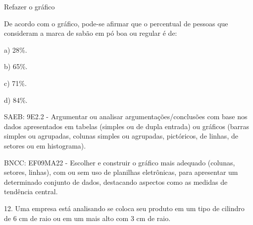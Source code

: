 \begin{escolha}
\begin{boxmedio}
\begin{boxmedio}
{\begin{boxpeq}
\begin{boxpeq}
{\begin{boxpeq}
\begin{boxmedio}
\begin{boxmedio}
\begin{boxpeq}
\begin{boxmedio}
\begin{boxpeq}
\begin{boxpeq}
\begin{boxpeq}
\begin{boxpeq}
\begin{boxmedio}
{\begin{boxmedio}
\begin{boxmedio}
\begin{boxpeq}
\begin{boxmedio}
\begin{boxpeq}
\begin{boxpeq}
\begin{boxpeq}
\begin{escolha}
{\begin{boxmedio}
\begin{boxpeq}
\begin{boxpeq}
\begin{boxpeq}
\begin{boxpeq}
\begin{boxpeq}
\begin{boxmedio}
\begin{boxpeq}
\begin{boxpeq}
\begin{boxpeq}
{\begin{boxpeq}
\begin{boxmedio}
\begin{boxpeq}
\begin{boxpeq}
\begin{boxpeq}
{\begin{boxpeq}
\begin{boxmedio}
{\begin{boxpeq}
\begin{boxpeq}
\begin{boxmedio}
\begin{boxmedio}
\begin{boxpeq}
\begin{boxpeq}
{\begin{boxpeq}
\begin{boxpeq}
\begin{boxpeq}
\begin{boxpeq}
\begin{boxpeq}
\begin{escolha}
\begin{escolha}
{\begin{boxmedio}
\begin{boxpeq}
\begin{q°}
\begin{boxmedio}
\begin{boxpeq}
\begin{boxpeq}
\begin{boxmedio}
\begin{boxmedio}
\begin{boxmedio}
\begin{boxmedio}
{\begin{escolha}
\begin{escolha}
\begin{escolha}
\begin{escolha}
\begin{escolha}
\begin{escolha}
{\begin{figure}
\end{figure}

Refazer o gráfico

De acordo com o gráfico, pode-se afirmar que o percentual de pessoas que
consideram a marca de sabão em pó boa ou regular é de:

a) 28\%.

b) 65\%.

c) 71\%.

d) 84\%.

SAEB: 9E2.2 - Argumentar ou analisar argumentações/conclusões com base
nos dados apresentados em tabelas (simples ou de dupla entrada) ou
gráficos (barras simples ou agrupadas, colunas simples ou agrupadas,
pictóricos, de linhas, de setores ou em histograma).

BNCC: EF09MA22 - Escolher e construir o gráfico mais adequado (colunas,
setores, linhas), com ou sem uso de planilhas eletrônicas, para
apresentar um determinado conjunto de dados, destacando aspectos como as
medidas de tendência central.

12. Uma empresa está analisando se coloca seu produto em um tipo de
cilindro de 6 cm de raio ou em um mais alto com 3 cm de raio.

}
\end{escolha}
\end{escolha}
\end{escolha}
\end{escolha}
\end{escolha}
\end{escolha}}
\end{boxmedio}
\end{boxmedio}
\end{boxmedio}
\end{boxmedio}
\end{boxpeq}
\end{boxpeq}
\end{boxmedio}
\end{q°}
\end{boxpeq}
\end{boxmedio}}
\end{escolha}
\end{escolha}
\end{boxpeq}
\end{boxpeq}
\end{boxpeq}
\end{boxpeq}
\end{boxpeq}}
\end{boxpeq}
\end{boxpeq}
\end{boxmedio}
\end{boxmedio}
\end{boxpeq}
\end{boxpeq}}
\end{boxmedio}
\end{boxpeq}}
\end{boxpeq}
\end{boxpeq}
\end{boxpeq}
\end{boxmedio}
\end{boxpeq}}
\end{boxpeq}
\end{boxpeq}
\end{boxpeq}
\end{boxmedio}
\end{boxpeq}
\end{boxpeq}
\end{boxpeq}
\end{boxpeq}
\end{boxpeq}
\end{boxmedio}}
\end{escolha}
\end{boxpeq}
\end{boxpeq}
\end{boxpeq}
\end{boxmedio}
\end{boxpeq}
\end{boxmedio}
\end{boxmedio}}
\end{boxmedio}
\end{boxpeq}
\end{boxpeq}
\end{boxpeq}
\end{boxpeq}
\end{boxmedio}
\end{boxpeq}
\end{boxmedio}
\end{boxmedio}
\end{boxpeq}}
\end{boxpeq}
\end{boxpeq}}
\end{boxmedio}
\end{boxmedio}
\end{escolha}
